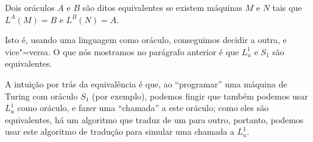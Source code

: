 \begin{definition}
    Dois oráculos $A$ e $B$ são ditos equivalentes
    se existem máquinas $M$ e $N$ tais que
    $L^A(M) = B$ e $L^B(N) = A$.
\end{definition}

Isto é, usando uma linguagem como oráculo, conseguimos decidir a outra,
e vice"=versa.
O que nós mostramos no parágrafo anterior é que
$L_u^1$ e $S_1$ são equivalentes.

A intuição por trás da equivalência é que,
ao ``programar'' uma máquina de Turing com oráculo $S_1$ (por exemplo),
podemos fingir que também podemos usar $L_u^1$ como oráculo,
e fazer uma ``chamada'' a este oráculo;
como eles são equivalentes,
há um algoritmo que traduz de um para outro,
portanto, podemos usar este algoritmo de tradução
para simular uma chamada a $L_u^1$.
